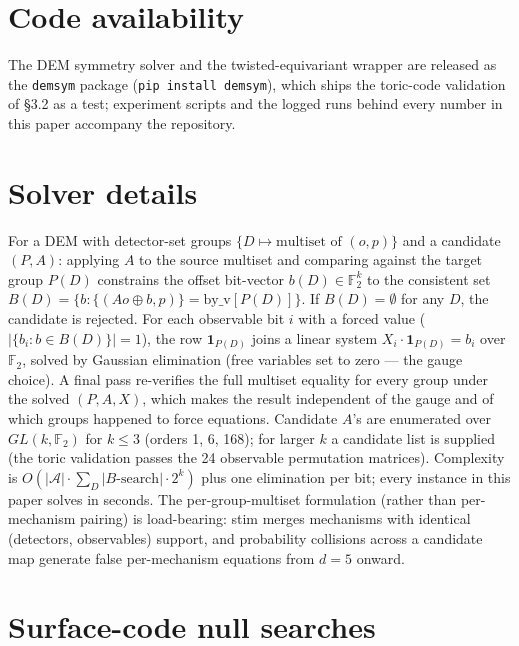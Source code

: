 \documentclass[11pt]{article}
\newcommand{\F}{\mathbb{F}}
\begin{document}
\section*{Code availability}

The DEM symmetry solver and the twisted-equivariant wrapper are released as
the \texttt{demsym} package (\texttt{pip install demsym}), which ships the
toric-code validation of \S3.2 as a test; experiment scripts and the logged
runs behind every number in this paper accompany the repository.

\appendix

\section{Solver details}
\label{app:solver}

For a DEM with detector-set groups $\{D \mapsto \text{multiset of }
(o, p)\}$ and a candidate $(P, A)$: applying $A$ to the source multiset and
comparing against the target group $P(D)$ constrains the offset bit-vector
$b(D) \in \F_2^k$ to the consistent set
$B(D) = \{b : \{(A o \oplus b, p)\} = \mathrm{by\_v}[P(D)]\}$. If
$B(D) = \emptyset$ for any $D$, the candidate is rejected. For each
observable bit $i$ with a forced value
($|\{b_i : b \in B(D)\}| = 1$), the row $\mathbf{1}_{P(D)}$ joins a linear
system $X_i \cdot \mathbf{1}_{P(D)} = b_i$ over $\F_2$, solved by Gaussian
elimination (free variables set to zero --- the gauge choice). A final pass
re-verifies the full multiset equality for every group under the solved
$(P, A, X)$, which makes the result independent of the gauge and of which
groups happened to force equations. Candidate $A$'s are enumerated over
$GL(k, \F_2)$ for $k \leq 3$ (orders 1, 6, 168); for larger $k$ a candidate
list is supplied (the toric validation passes the 24 observable permutation
matrices). Complexity is
$O(|\mathcal{A}| \cdot \sum_D |B\text{-search}| \cdot 2^k)$ plus one
elimination per bit; every instance in this paper solves in seconds. The
per-group-multiset formulation (rather than per-mechanism pairing) is
load-bearing: stim merges mechanisms with identical (detectors, observables)
support, and probability collisions across a candidate map generate false
per-mechanism equations from $d = 5$ onward.

\section{Surface-code null searches}
\label{app:nulls}
\end{document}
